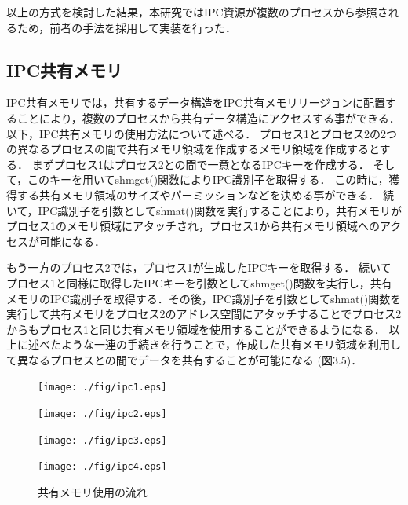 以上の方式を検討した結果，本研究ではIPC資源が複数のプロセスから参照されるため，前者の手法を採用して実装を行った．

\subsection*{IPC共有メモリ}

IPC共有メモリでは，共有するデータ構造をIPC共有メモリリージョンに配置することにより，複数のプロセスから共有データ構造にアクセスする事ができる．
以下，IPC共有メモリの使用方法について述べる．
プロセス1とプロセス2の2つの異なるプロセスの間で共有メモリ領域を作成するメモリ領域を作成するとする．
まずプロセス1はプロセス2との間で一意となるIPCキーを作成する．
そして，このキーを用いてshmget()関数によりIPC識別子を取得する．
この時に，獲得する共有メモリ領域のサイズやパーミッションなどを決める事ができる．
続いて，IPC識別子を引数としてshmat()関数を実行することにより，共有メモリがプロセス1のメモリ領域にアタッチされ，プロセス1から共有メモリ領域へのアクセスが可能になる．

もう一方のプロセス2では，プロセス1が生成したIPCキーを取得する．
続いてプロセス1と同様に取得したIPCキーを引数としてshmget()関数を実行し，共有メモリのIPC識別子を取得する．その後，IPC識別子を引数としてshmat()関数を実行して共有メモリをプロセス2のアドレス空間にアタッチすることでプロセス2からもプロセス1と同じ共有メモリ領域を使用することができるようになる．
以上に述べたような一連の手続きを行うことで，作成した共有メモリ領域を利用して異なるプロセスとの間でデータを共有することが可能になる (図3.5)．

\begin{figure}[H]
    \hspace*{\fill}
    \texttt{[image: ./fig/ipc1.eps]}
    \hspace*{\fill}
    
\end{figure}

\begin{figure}[H]
    \hspace*{\fill}
    \texttt{[image: ./fig/ipc2.eps]}
    \hspace*{\fill}
\end{figure}


\begin{figure}[H]
    \hspace*{\fill}
    \texttt{[image: ./fig/ipc3.eps]}
    \hspace*{\fill}
\end{figure}

\begin{figure}[H]
    \hspace*{\fill}
    \texttt{[image: ./fig/ipc4.eps]}
    \hspace*{\fill}
    \caption{共有メモリ使用の流れ}
\end{figure}


